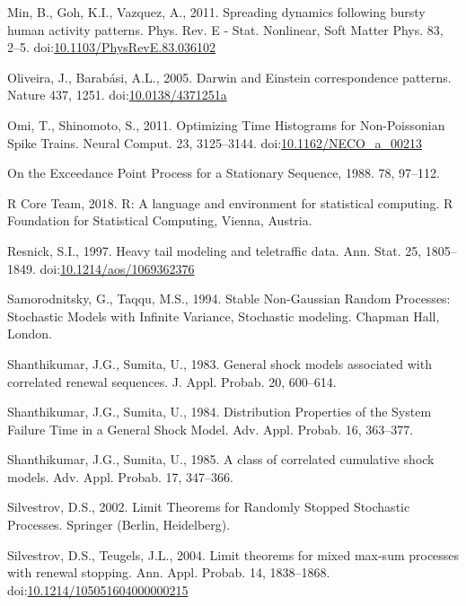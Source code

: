 \documentclass[]{elsarticle} %
\begin{document}
\leavevmode\hypertarget{ref-Min2010}{}%
Min, B., Goh, K.I., Vazquez, A., 2011. Spreading dynamics following
bursty human activity patterns. Phys. Rev. E - Stat. Nonlinear, Soft
Matter Phys. 83, 2--5.
doi:\href{https://doi.org/10.1103/PhysRevE.83.036102}{10.1103/PhysRevE.83.036102}

\leavevmode\hypertarget{ref-Oliveira2005}{}%
Oliveira, J., Barabási, A.L., 2005. Darwin and Einstein correspondence
patterns. Nature 437, 1251.
doi:\href{https://doi.org/10.0138/4371251a}{10.0138/4371251a}

\leavevmode\hypertarget{ref-Omi2011}{}%
Omi, T., Shinomoto, S., 2011. Optimizing Time Histograms for
Non-Poissonian Spike Trains. Neural Comput. 23, 3125--3144.
doi:\href{https://doi.org/10.1162/NECO_a_00213}{10.1162/NECO\_a\_00213}

\leavevmode\hypertarget{ref-Hsing88}{}%
On the Exceedance Point Process for a Stationary Sequence, 1988. 78,
97--112.

\leavevmode\hypertarget{ref-R}{}%
R Core Team, 2018. R: A language and environment for statistical
computing. R Foundation for Statistical Computing, Vienna, Austria.

\leavevmode\hypertarget{ref-Resnick97}{}%
Resnick, S.I., 1997. Heavy tail modeling and teletraffic data. Ann.
Stat. 25, 1805--1849.
doi:\href{https://doi.org/10.1214/aos/1069362376}{10.1214/aos/1069362376}

\leavevmode\hypertarget{ref-SamorodnitskyTaqqu}{}%
Samorodnitsky, G., Taqqu, M.S., 1994. Stable Non-Gaussian Random
Processes: Stochastic Models with Infinite Variance, Stochastic
modeling. Chapman Hall, London.

\leavevmode\hypertarget{ref-Sumita1983}{}%
Shanthikumar, J.G., Sumita, U., 1983. General shock models associated
with correlated renewal sequences. J. Appl. Probab. 20, 600--614.

\leavevmode\hypertarget{ref-Sumita1984}{}%
Shanthikumar, J.G., Sumita, U., 1984. Distribution Properties of the
System Failure Time in a General Shock Model. Adv. Appl. Probab. 16,
363--377.

\leavevmode\hypertarget{ref-Sumita1985}{}%
Shanthikumar, J.G., Sumita, U., 1985. A class of correlated cumulative
shock models. Adv. Appl. Probab. 17, 347--366.

\leavevmode\hypertarget{ref-Silvestrov2002a}{}%
Silvestrov, D.S., 2002. Limit Theorems for Randomly Stopped Stochastic
Processes. Springer (Berlin, Heidelberg).

\leavevmode\hypertarget{ref-ST04}{}%
Silvestrov, D.S., Teugels, J.L., 2004. Limit theorems for mixed max-sum
processes with renewal stopping. Ann. Appl. Probab. 14, 1838--1868.
doi:\href{https://doi.org/10.1214/105051604000000215}{10.1214/105051604000000215}
\end{document}

